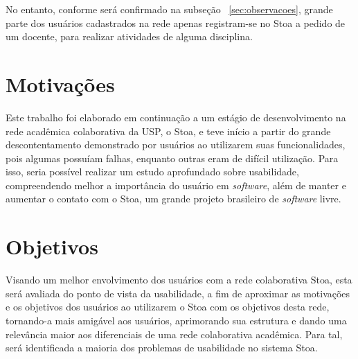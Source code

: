     No entanto, conforme será confirmado na subseção ~\ref{sec:observacoes}, grande parte dos usuários cadastrados na rede apenas registram-se no Stoa a pedido de um docente, para realizar atividades de alguma disciplina. 
    


\section{Motivações}
\label{sec:motivos}

    Este trabalho foi elaborado em continuação a um estágio de desenvolvimento na rede acadêmica colaborativa da USP, o Stoa, e teve início a partir do grande descontentamento demonstrado por usuários ao utilizarem suas funcionalidades, pois algumas possuíam falhas, enquanto outras eram de difícil utilização. Para isso, seria possível realizar um estudo aprofundado sobre usabilidade, compreendendo melhor a importância do usuário em \emph{software}, além de manter e aumentar o contato com o Stoa, um grande projeto brasileiro de \emph{software} livre. 
    
    



\section{Objetivos}
\label{sec:objetivo}

    Visando um melhor envolvimento dos usuários com a rede colaborativa Stoa, esta será avaliada do ponto de vista da usabilidade, a fim de aproximar as motivações e os objetivos dos usuários ao utilizarem o Stoa com os objetivos desta rede, tornando-a mais amigável aos usuários, aprimorando sua estrutura e dando uma relevância maior aos diferenciais de uma rede colaborativa acadêmica. Para tal, será identificada a maioria dos problemas de usabilidade no sistema Stoa. 
    
